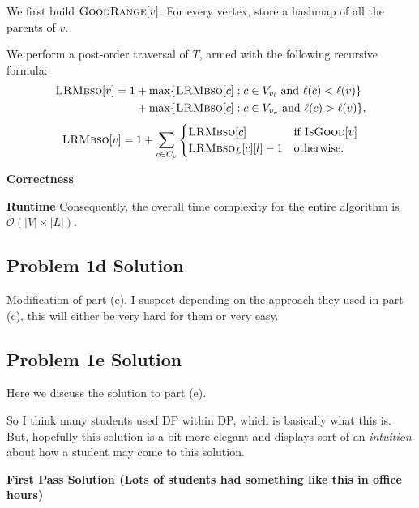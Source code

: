 \documentclass{article}
\begin{document}
    We first build $\textsc{GoodRange}[v]$. For every vertex, store a hashmap of all the parents of $v$. 



        
    We perform a post-order traversal of $T$, armed with the following recursive formula:
    \begin{align*}
        \textsc{LRMbso}[v] = 1 &+ \max\{\textsc{LRMbso}[c] : c \in V_{v_{l}} \text{ and } \ell(c) < \ell(v)\} \\
        & + \max\{\textsc{LRMbso}[c] : c \in V_{v_{r}} \text{ and } \ell(c) > \ell(v)\},
    \end{align*}
    $$\textsc{LRMbso}[v] = 1 + \sum_{c \in C_{v}} 
    \begin{cases}
        \textsc{LRMbso}[c] & \text{if $\textsc{IsGood}[v]$} \\
        \textsc{LRMbso}_{L}[c][l] - 1 & \text{otherwise}.
    \end{cases}$$
    
    \vspace{2mm}
    \textbf{Correctness}

    \vspace{2mm}
    \textbf{Runtime}
    Consequently, the overall time complexity for the entire algorithm is \( \mathcal{O}(|V| \times |L|) \).

    \pagebreak
    \subsection*{Problem 1d Solution}
     Modification of part (c). I suspect depending on the approach they used in part (c), this will either be very hard for them or very easy.

      \pagebreak
    \subsection*{Problem 1e Solution}
     Here we discuss the solution to part (e).

    \begin{tcolorbox}
        So I think many students used DP within DP, which is basically what this is. But, hopefully this solution is a bit more elegant and displays sort of an \textit{intuition} about how a student may come to this solution.
    \end{tcolorbox}

        \textbf{First Pass Solution (Lots of students had something like this in office hours)}
        
\end{document}
